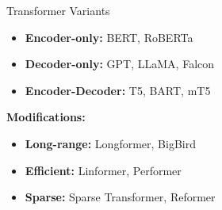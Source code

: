 \begin{frame}{Transformer Variants}
  \begin{itemize}
    \item[$\blacktriangleright$] \textbf{Encoder-only:} BERT, RoBERTa
    \item[$\blacktriangleright$] \textbf{Decoder-only:} GPT, LLaMA, Falcon
    \item[$\blacktriangleright$] \textbf{Encoder-Decoder:} T5, BART, mT5
  \end{itemize}
  \vspace{1em}
  \textbf{Modifications:}
  \begin{itemize}
    \item[$\blacktriangleright$] \textbf{Long-range:} Longformer, BigBird
    \item[$\blacktriangleright$] \textbf{Efficient:} Linformer, Performer
    \item[$\blacktriangleright$] \textbf{Sparse:} Sparse Transformer, Reformer
  \end{itemize}
\end{frame}

